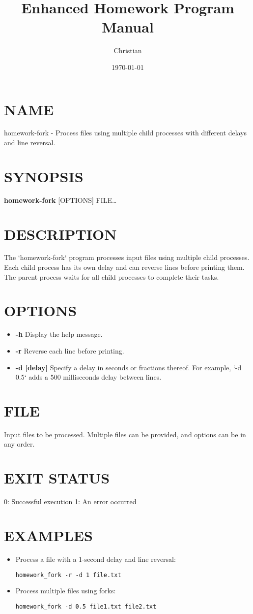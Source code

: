 \documentclass[11pt]{article}
\author{Christian}
\date{\today}
\title{Enhanced Homework Program Manual}
\begin{document}
\section{NAME}
\label{sec:org59d775d}
homework-fork - Process files using multiple child processes with different delays and line reversal.
\section{SYNOPSIS}
\label{sec:org692eed8}
\textbf{\textbf{homework-fork}} [OPTIONS] FILE\ldots{}
\section{DESCRIPTION}
\label{sec:orgecef3c4}
The `homework-fork` program processes input files using multiple child processes. Each child process has its own delay and can reverse lines before printing them. The parent process waits for all child processes to complete their tasks.
\section{OPTIONS}
\label{sec:orge436785}
\begin{itemize}
\item \textbf{\textbf{-h}}
Display the help message.

\item \textbf{\textbf{-r}}
Reverse each line before printing.

\item \textbf{\textbf{-d [delay]}}
Specify a delay in seconds or fractions thereof. For example, `-d 0.5` adds a 500 milliseconds delay between lines.
\end{itemize}
\section{FILE}
\label{sec:orgbbd75c2}
Input files to be processed. Multiple files can be provided, and options can be in any order.
\section{EXIT STATUS}
\label{sec:org420983e}
0: Successful execution
1: An error occurred
\section{EXAMPLES}
\label{sec:org49aa7f4}
\begin{itemize}
\item Process a file with a 1-second delay and line reversal:
\begin{verbatim}
homework_fork -r -d 1 file.txt
\end{verbatim}

\item Process multiple files using forks:
\begin{verbatim}
homework_fork -d 0.5 file1.txt file2.txt
\end{verbatim}
\end{itemize}
\end{document}
